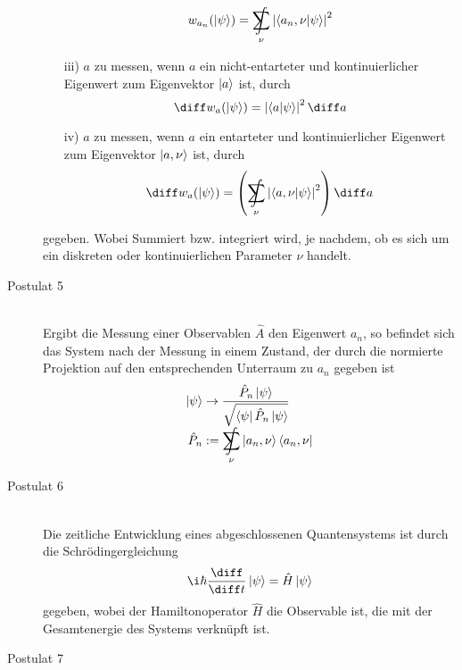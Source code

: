\documentclass[11pt]{article}
\DeclareMathOperator*{\SumInt}{%
\mathchoice%
  {\ooalign{$\displaystyle\sum$\cr\hidewidth$\displaystyle\int$\hidewidth\cr}}
  {\ooalign{\raisebox{.14\height}{\scalebox{.7}{$\textstyle\sum$}}\cr\hidewidth$\textstyle\int$\hidewidth\cr}}
  {\ooalign{\raisebox{.2\height}{\scalebox{.6}{$\scriptstyle\sum$}}\cr$\scriptstyle\int$\cr}}
  {\ooalign{\raisebox{.2\height}{\scalebox{.6}{$\scriptstyle\sum$}}\cr$\scriptstyle\int$\cr}}
}
\numberwithin{equation}{section}
\begin{document}
\begin{description}
\begin{itemize}
\begin{equation}
              w_{a_n}(\Ket{\psi}) = \SumInt_\nu \left|\braket{a_n ,\nu|\psi}\right|^2
            \end{equation}
            \item[iii)] $a$ zu messen, wenn $a$ ein nicht-entarteter und kontinuierlicher Eigenwert zum Eigenvektor $\Ket{a}$ ist, durch
            \begin{equation}
              \diff w_a(\Ket{\psi}) = \left| \braket{a|\psi} \right|^2 \diff a
            \end{equation}
            \item[iv)] $a$ zu messen, wenn $a$ ein entarteter und kontinuierlicher Eigenwert zum Eigenvektor $\Ket{a, \nu}$ ist, durch
            \begin{equation}
              \diff w_a(\Ket{\psi}) = \left( \SumInt_\nu \left| \braket{a,\nu |\psi} \right|^2 \right) \diff a
            \end{equation}
          \end{itemize}
          gegeben. Wobei Summiert bzw. integriert wird, je nachdem, ob es sich um ein diskreten oder kontinuierlichen Parameter $\nu$ handelt.
        \item[Postulat 5]\hfill \\
          Ergibt die Messung einer Observablen $\hat{A}$ den Eigenwert $a_n$, so befindet sich das System nach der Messung in einem Zustand, der durch die normierte Projektion auf den entsprechenden Unterraum zu $a_n$ gegeben ist
          \begin{equation}
            \begin{aligned}
              \Ket{\psi} &\rightarrow \frac{\hat{P}_n\Ket{\psi}} {\sqrt{\Bra{\psi}\hat{P}_n\Ket{\psi}}} \\
              \hat{P}_n &:= \SumInt_\nu \Ket{a_n,\nu}\Bra{a_n,\nu} \\
            \end{aligned}
          \end{equation}
        \item[Postulat 6]\hfill \\
          Die zeitliche Entwicklung eines abgeschlossenen Quantensystems ist durch die Schrödingergleichung
          \begin{equation}
            \i\hbar\tder{}{t}\Ket{\psi} = \hat{H}\Ket{\psi}
          \end{equation}
          gegeben, wobei der Hamiltonoperator $\hat{H}$ die Observable ist, die mit der Gesamtenergie des Systems verknüpft ist.
        \item[Postulat 7]\hfill \\

\end{description}
\end{document}
